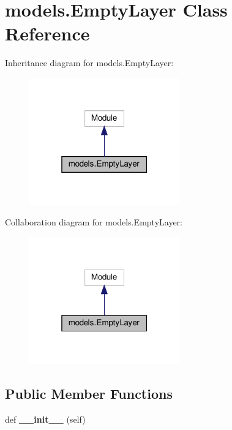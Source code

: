\hypertarget{classmodels_1_1EmptyLayer}{}\section{models.\+Empty\+Layer Class Reference}
\label{classmodels_1_1EmptyLayer}


Inheritance diagram for models.\+Empty\+Layer\+:
\nopagebreak
\begin{figure}[H]
\begin{center}
\leavevmode
\includegraphics[width=184pt]{classmodels_1_1EmptyLayer__inherit__graph}
\end{center}
\end{figure}


Collaboration diagram for models.\+Empty\+Layer\+:
\nopagebreak
\begin{figure}[H]
\begin{center}
\leavevmode
\includegraphics[width=184pt]{classmodels_1_1EmptyLayer__coll__graph}
\end{center}
\end{figure}
\subsection*{Public Member Functions}
\begin{DoxyCompactItemize}
\item 
\mbox{\label{classmodels_1_1EmptyLayer_a60514d2f5b33ee5677e019372b859c03}} 
def {\bfseries \+\_\+\+\_\+init\+\_\+\+\_\+} (self)
\end{DoxyCompactItemize}


